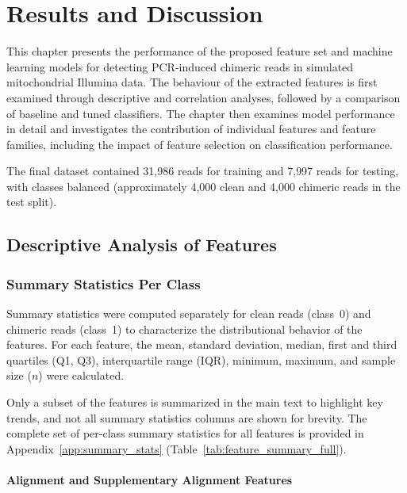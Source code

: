 \chapter{Results and Discussion}

This chapter presents the performance of the proposed feature set and machine learning models for detecting PCR-induced chimeric reads in simulated mitochondrial Illumina data. The behaviour of the extracted features is first examined through descriptive and correlation analyses, followed by a comparison of baseline and tuned classifiers. The chapter then examines model performance in detail and investigates the contribution of individual features and feature families, including the impact of feature selection on classification performance.

The final dataset contained 31{,}986 reads for training and 7{,}997 reads for testing, with classes balanced (approximately 4{,}000 clean and 4{,}000 chimeric reads in the test split).

\section{Descriptive Analysis of Features}
\subsection{Summary Statistics Per Class}

Summary statistics were computed separately for clean reads (class~0) and chimeric reads (class~1) to characterize the distributional behavior of the features. For each feature, the mean, standard deviation, median, first and third quartiles (Q1, Q3), interquartile range (IQR), minimum, maximum, and sample size ($n$) were calculated.

Only a subset of the features is summarized in the main text to highlight key trends, and not all summary statistics columns are shown for brevity. The complete set of per-class summary statistics for all features is provided in Appendix~\ref{app:summary_stats} (Table~\ref{tab:feature_summary_full}).

\subsubsection{Alignment and Supplementary Alignment Features}


